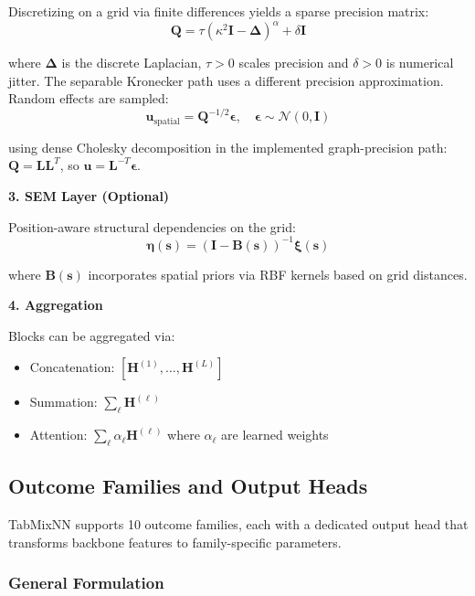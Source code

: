 \documentclass[12pt,a4paper]{article}
\newcommand{\N}{\mathcal{N}}
\newcommand{\bU}{\mathbf{u}}
\begin{document}
Discretizing on a grid via finite differences yields a sparse precision matrix:
\begin{equation}
    \mathbf{Q} = \tau(\kappa^2\mathbf{I} - \boldsymbol{\Delta})^{\alpha}+\delta\mathbf I
\end{equation}

where $\boldsymbol{\Delta}$ is the discrete Laplacian, $\tau>0$ scales precision and $\delta>0$ is numerical jitter. The separable Kronecker path uses a different precision approximation. Random effects are sampled:
\begin{equation}
    \bU_{\text{spatial}} = \mathbf{Q}^{-1/2}\boldsymbol{\epsilon}, \quad \boldsymbol{\epsilon} \sim \N(0, \mathbf{I})
\end{equation}

using dense Cholesky decomposition in the implemented graph-precision path: $\mathbf{Q} = \mathbf{LL}^T$, so $\bU = \mathbf{L}^{-T}\boldsymbol{\epsilon}$.

\textbf{3. SEM Layer (Optional)}

Position-aware structural dependencies on the grid:
\begin{equation}
    \boldsymbol{\eta}(\mathbf{s}) = (\mathbf{I} - \mathbf{B}(\mathbf{s}))^{-1}\boldsymbol{\xi}(\mathbf{s})
\end{equation}

where $\mathbf{B}(\mathbf{s})$ incorporates spatial priors via RBF kernels based on grid distances.

\textbf{4. Aggregation}

Blocks can be aggregated via:
\begin{itemize}
    \item Concatenation: $[\mathbf{H}^{(1)}, \ldots, \mathbf{H}^{(L)}]$
    \item Summation: $\sum_{\ell} \mathbf{H}^{(\ell)}$
    \item Attention: $\sum_{\ell} \alpha_\ell \mathbf{H}^{(\ell)}$ where $\alpha_\ell$ are learned weights
\end{itemize}

\subsection{Outcome Families and Output Heads}
\label{sec:families}

TabMixNN supports 10 outcome families, each with a dedicated output head that transforms backbone features to family-specific parameters.

\subsubsection{General Formulation}
\end{document}
